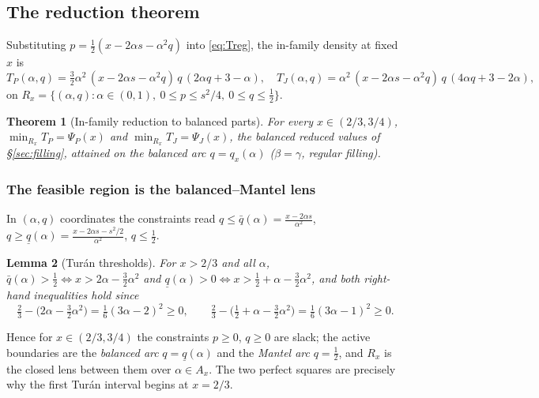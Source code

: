 \documentclass[11pt]{amsart}
\newtheorem{theorem}{Theorem}[section]
\newtheorem{lemma}[theorem]{Lemma}
\theoremstyle{definition}
\newcommand{\1}{\mathbf 1}
\begin{document}
\subsection{The reduction theorem}

Substituting $p=\tfrac12(x-2\alpha s-\alpha^2 q)$ into \eqref{eq:Treg}, the
in-family density at fixed $x$ is
\begin{equation}
\label{eq:T2}
   T_P(\alpha,q)=\tfrac32\alpha^2\,(x-2\alpha s-\alpha^2 q)\,q\,(2\alpha q+3-\alpha),
   \quad
   T_J(\alpha,q)=\alpha^2\,(x-2\alpha s-\alpha^2 q)\,q\,(4\alpha q+3-2\alpha),
\end{equation}
on $R_x=\{(\alpha,q):\alpha\in(0,1),\ 0\le p\le s^2/4,\ 0\le q\le\tfrac12\}$.

\begin{theorem}[In-family reduction to balanced parts]
\label{thm:balancing-main}
For every $x\in(2/3,3/4)$,
$\min_{R_x}T_P=\Psi_P(x)$ and $\min_{R_x}T_J=\Psi_J(x)$, the balanced reduced
values of \S\ref{sec:filling}, attained on the balanced arc $q=q_x(\alpha)$
($\beta=\gamma$, regular filling).
\end{theorem}

\subsubsection*{The feasible region is the balanced--Mantel lens}

In $(\alpha,q)$ coordinates the constraints read
$q\le\bar q(\alpha)=\frac{x-2\alpha s}{\alpha^2}$,
$q\ge\underline q(\alpha)=\frac{x-2\alpha s-s^2/2}{\alpha^2}$, $q\le\tfrac12$.

\begin{lemma}[Tur\'an thresholds]
\label{lem:turan}
For $x>2/3$ and all $\alpha$, $\bar q(\alpha)>\tfrac12\Leftrightarrow
x>2\alpha-\tfrac32\alpha^2$ and $\underline q(\alpha)>0\Leftrightarrow
x>\tfrac12+\alpha-\tfrac32\alpha^2$, and both right-hand inequalities hold since
\[
   \tfrac23-\bigl(2\alpha-\tfrac32\alpha^2\bigr)=\tfrac16(3\alpha-2)^2\ge0,
   \qquad
   \tfrac23-\bigl(\tfrac12+\alpha-\tfrac32\alpha^2\bigr)=\tfrac16(3\alpha-1)^2\ge0.
\]
\end{lemma}

Hence for $x\in(2/3,3/4)$ the constraints $p\ge0$, $q\ge0$ are slack; the active
boundaries are the \emph{balanced arc} $q=\underline q(\alpha)$ and the
\emph{Mantel arc} $q=\tfrac12$, and $R_x$ is the closed lens between them over
$\alpha\in A_x$.  The two perfect squares are precisely why the first Tur\'an
interval begins at $x=2/3$.
\end{document}
